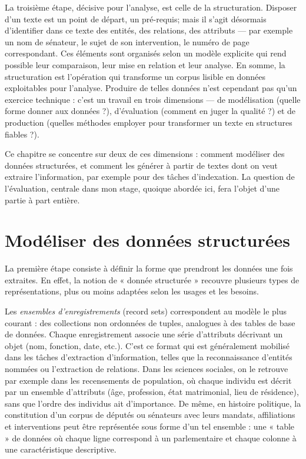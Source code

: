 La troisième étape, décisive pour l’analyse, est celle de la structuration. Disposer d’un texte est un point de départ, un pré-requis; mais il s'agit désormais d’identifier dans ce texte des entités, des relations, des attributs — par exemple un nom de sénateur, le sujet de son intervention, le numéro de page correspondant. Ces éléments sont organisés selon un modèle explicite qui rend possible leur comparaison, leur mise en relation et leur analyse. En somme, la structuration est l’opération qui transforme un corpus lisible en données exploitables pour l'analyse. Produire de telles données n’est cependant pas qu’un exercice technique : c’est un travail en trois dimensions — de modélisation (quelle forme donner aux données ?), d’évaluation (comment en juger la qualité ?) et de production (quelles méthodes employer pour transformer un texte en structures fiables ?).

Ce chapitre se concentre sur deux de ces dimensions : comment modéliser des données structurées, et comment les générer à partir de textes dont on veut extraire l'information, par exemple pour des tâches d'indexation. La question de l’évaluation, centrale dans mon stage, quoique abordée ici, fera l’objet d’une partie à part entière.

\section{Modéliser des données structurées}

La première étape consiste à définir la forme que prendront les données une fois extraites. En effet, la notion de « donnée structurée » recouvre plusieurs types de représentations, plus ou moins adaptées selon les usages et les besoins.

Les \emph{ensembles d’enregistrements} (record sets) correspondent au modèle le plus courant : des collections non ordonnées de tuples, analogues à des tables de base de données. Chaque enregistrement associe une série d’attributs décrivant un objet (nom, fonction, date, etc.). C’est ce format qui est généralement mobilisé dans les tâches d’extraction d’information, telles que la reconnaissance d’entités nommées ou l’extraction de relations. Dans les sciences sociales, on le retrouve par exemple dans les recensements de population, où chaque individu est décrit par un ensemble d’attributs (âge, profession, état matrimonial, lieu de résidence), sans que l’ordre des individus ait d’importance. De même, en histoire politique, la constitution d’un corpus de députés ou sénateurs avec leurs mandats, affiliations et interventions peut être représentée sous forme d’un tel ensemble : une « table » de données où chaque ligne correspond à un parlementaire et chaque colonne à une caractéristique descriptive.

